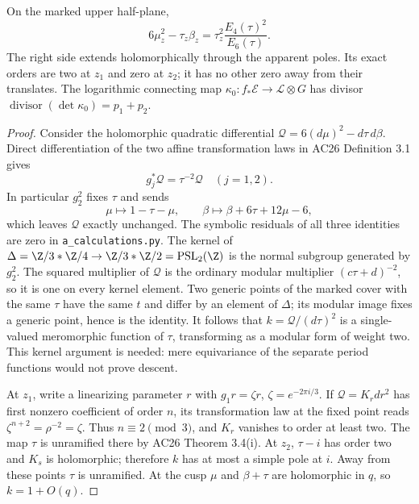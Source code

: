 \begin{proposition}\label{inv:A2.1}
On the marked upper half-plane,
\begin{equation}\label{inv:eq:A-modular-K}
6\mu_z^2-\tau_z\beta_z
=\tau_z^2\frac{E_4(\tau)^2}{E_6(\tau)}.
\end{equation}
The right side extends holomorphically through the apparent poles.
Its exact orders are two at $z_1$ and zero at $z_2$; it has no other
zero away from their translates.  The logarithmic connecting map
$\kappa_0:f_*\mathcal E\to\mathcal L\otimes G$ has divisor
$\operatorname{divisor}(\det\kappa_0)=p_1+p_2$.
\end{proposition}
\begin{proof}
Consider the holomorphic quadratic differential
$\mathscr Q=6(d\mu)^2-d\tau\,d\beta$.  Direct differentiation of
the two affine transformation laws in AC26 Definition 3.1 gives
\[
g_j^*\mathscr Q=\tau^{-2}\mathscr Q\quad(j=1,2).
\]
In particular $g_2^2$ fixes $\tau$ and sends
\[
\mu\longmapsto1-\tau-\mu,\qquad
\beta\longmapsto\beta+6\tau+12\mu-6,
\]
which leaves $\mathscr Q$ exactly unchanged.  The symbolic residuals
of all three identities are zero in \texttt{a\_calculations.py}.
The kernel of
$\Delta=\Z/3*\Z/4\to\Z/3*\Z/2=\operatorname{PSL}_2(\Z)$
is the normal subgroup generated by $g_2^2$.  The squared multiplier
of $\mathscr Q$ is the ordinary modular multiplier
$(c\tau+d)^{-2}$, so it is one on every kernel element.  Two generic
points of the marked cover with the same $\tau$ have the same $t$
and differ by an element of $\Delta$; its modular image fixes a
generic point, hence is the identity.  It follows that
$k=\mathscr Q/(d\tau)^2$ is a single-valued meromorphic function of
$\tau$, transforming as a modular form of weight two.  This kernel
argument is needed: mere equivariance of the separate period functions
would not prove descent.

At $z_1$, write a linearizing parameter $r$ with
$g_1r=\zeta r$, $\zeta=e^{-2\pi i/3}$.  If $\mathscr Q=K_rdr^2$
has first nonzero coefficient of order $n$, its transformation law
at the fixed point reads $\zeta^{n+2}=\rho^{-2}=\zeta$.
Thus $n\equiv2\pmod3$, and $K_r$ vanishes to order at least two.
The map $\tau$ is unramified there by AC26 Theorem 3.4(i).  At
$z_2$, $\tau-i$ has order two and $K_s$ is holomorphic; therefore
$k$ has at most a simple pole at $i$.  Away from these points
$\tau$ is unramified.  At the cusp $\mu$ and $\beta+\tau$ are
holomorphic in $q$, so $k=1+O(q)$.


\end{proof}

